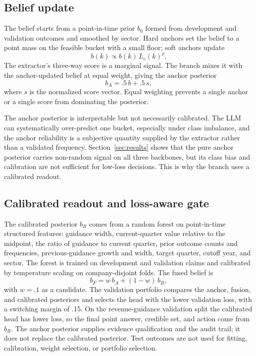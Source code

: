 \documentclass[11pt]{article}
\begin{document}
\subsection{Belief update}
The belief starts from a point-in-time prior $b_0$ formed from development and validation outcomes and smoothed by sector. Hard anchors set the belief to a point mass on the feasible bucket with a small floor; soft anchors update
\begin{equation}
b(k)\propto b(k)\,L_e(k)^{\rho}.
\end{equation}
The extractor's three-way score is a marginal signal. The branch mixes it with the anchor-updated belief at equal weight, giving the anchor posterior
\begin{equation}
b_A=.5\,b+.5\,s,
\end{equation}
where $s$ is the normalized score vector. Equal weighting prevents a single anchor or a single score from dominating the posterior.

The anchor posterior is interpretable but not necessarily calibrated. The LLM can systematically over-predict one bucket, especially under class imbalance, and the anchor reliability is a subjective quantity supplied by the extractor rather than a validated frequency. Section~\ref{sec:results} shows that the pure anchor posterior carries non-random signal on all three backbones, but its class bias and calibration are not sufficient for low-loss decisions. This is why the branch uses a calibrated readout.

\subsection{Calibrated readout and loss-aware gate}
The calibrated posterior $b_R$ comes from a random forest on point-in-time structured features: guidance width, current-quarter value relative to the midpoint, the ratio of guidance to current quarter, prior outcome counts and frequencies, previous-guidance growth and width, target quarter, cutoff year, and sector. The forest is trained on development and validation claims and calibrated by temperature scaling on company-disjoint folds. The fused belief is
\begin{equation}
b_F=w\,b_A+(1-w)\,b_R,
\end{equation}
with $w=.1$ as a candidate. The validation portfolio compares the anchor, fusion, and calibrated posteriors and selects the head with the lower validation loss, with a switching margin of .15. On the revenue-guidance validation split the calibrated head has lower loss, so the final point answer, credible set, and action come from $b_R$. The anchor posterior supplies evidence qualification and the audit trail; it does not replace the calibrated posterior. Test outcomes are not used for fitting, calibration, weight selection, or portfolio selection.
\end{document}
